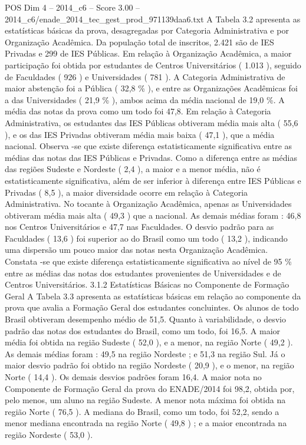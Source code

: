 \begin{textsample}{POS Dim 4 – 2014\_c6 – Score 3.00 – 2014\_c6/enade\_2014\_tec\_gest\_prod\_971139daa6.txt}
A Tabela 3.2 apresenta as estatísticas básicas da prova, desagregadas por Categoria Administrativa e por Organização Acadêmica.
Da população total de inscritos, 2.421 são de IES Privadas e 299 de IES Públicas.
Em relação à Organização Acadêmica, a maior participação foi obtida por estudantes de Centros Universitários ( 1.013 ), seguido de Faculdades ( 926 ) e Universidades ( 781 ).
A Categoria Administrativa de maior abstenção foi a Pública ( 32,8 \% ), e entre as Organizações Acadêmicas foi a das Universidades ( 21,9 \% ), ambos acima da média nacional de 19,0 \%.
A média das notas da prova como um todo foi 47,8.
Em relação à Categoria Administrativa, os estudantes das IES Públicas obtiveram média mais alta ( 55,6 ), e os das IES Privadas obtiveram média mais baixa ( 47,1 ), que a média nacional.
Observa -se que existe diferença estatisticamente significativa entre as médias das notas das IES Públicas e Privadas.
Como a diferença entre as médias das regiões Sudeste e Nordeste ( 2,4 ), a maior e a menor média, não é estatisticamente significativa, além de ser inferior à diferença entre IES Públicas e Privadas ( 8,5 ), a maior diversidade ocorre em relação à Categoria Administrativa.
No tocante à Organização Acadêmica, apenas as Universidades obtiveram média mais alta ( 49,3 ) que a nacional.
As demais médias foram : 46,8 nos Centros Universitários e 47,7 nas Faculdades.
O desvio padrão para as Faculdades ( 13,6 ) foi superior ao do Brasil como um todo ( 13,2 ), indicando uma dispersão um pouco maior das notas nesta Organização Acadêmica.
Constata -se que existe diferença estatisticamente significativa ao nível de 95 \% entre as médias das notas dos estudantes provenientes de Universidades e de Centros Universitários. 3.1.2 Estatísticas Básicas no Componente de Formação Geral A Tabela 3.3 apresenta as estatísticas básicas em relação ao componente da prova que avalia a Formação Geral dos estudantes concluintes.
Os alunos de todo Brasil obtiveram desempenho médio de 51,5.
Quanto à variabilidade, o desvio padrão das notas dos estudantes do Brasil, como um todo, foi 16,5.
A maior média foi obtida na região Sudeste ( 52,0 ), e a menor, na região Norte ( 49,2 ).
As demais médias foram : 49,5 na região Nordeste ; e 51,3 na região Sul.
Já o maior desvio padrão foi obtido na região Nordeste ( 20,9 ), e o menor, na região Norte ( 14,4 ).
Os demais desvios padrões foram 16,4.
A maior nota no Componente de Formação Geral da prova do ENADE/2014 foi 98,2, obtida por, pelo menos, um aluno na região Sudeste.
A menor nota máxima foi obtida na região Norte ( 76,5 ).
A mediana do Brasil, como um todo, foi 52,2, sendo a menor mediana encontrada na região Norte ( 49,8 ) ; e a maior encontrada na região Nordeste ( 53,0 ).

\end{textsample}
